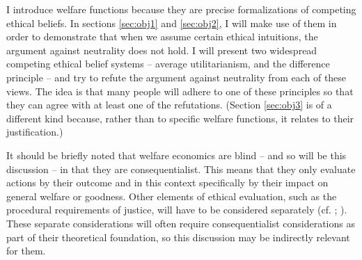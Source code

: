 I introduce welfare functions because they are precise formalizations of competing ethical beliefs. In sections \ref{sec:obj1} and \ref{sec:obj2}, I will make use of them in order to demonstrate that when we assume certain ethical intuitions, the argument against neutrality does not hold. I will present two widespread competing ethical belief systems – average utilitarianism, and the difference principle – and try to refute the argument against neutrality from each of these views. The idea is that many people will adhere to one of these principles so that they can agree with at least one of the refutations. (Section \ref{sec:obj3} is of a different kind because, rather than to specific welfare functions, it relates to their justification.)

It should be briefly noted that welfare economics are blind -- and so will be this discussion -- in that they are consequentialist. This means that they only evaluate actions by their outcome and in this context specifically by their impact on general welfare or goodness. Other elements of ethical evaluation, such as the procedural requirements of justice, will have to be considered separately (cf. ; ). These separate considerations will often require consequentialist considerations as part of their theoretical foundation, so this discussion may be indirectly relevant for them. 